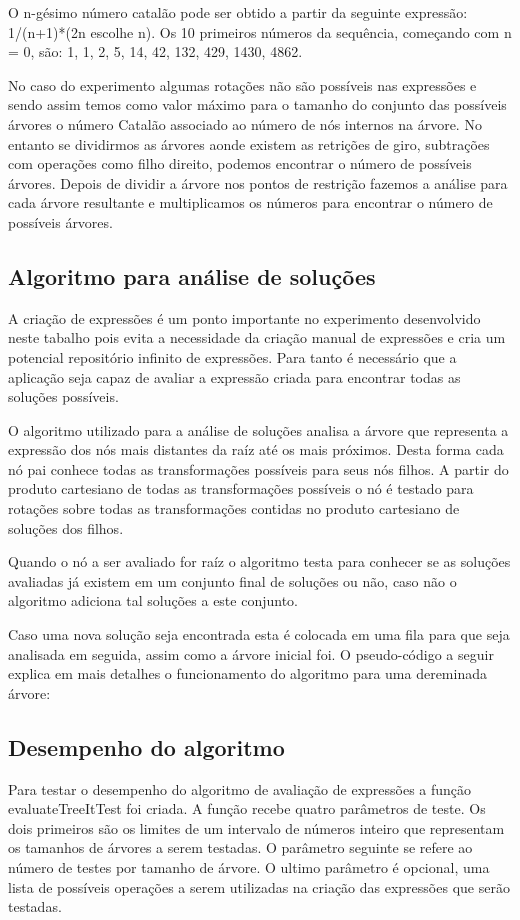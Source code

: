 	O n-gésimo número catalão pode ser obtido a partir da seguinte expressão: 1/(n+1)*(2n escolhe n). Os 10 primeiros números da sequência, começando com n = 0, são: 1, 1, 2, 5, 14, 42, 132, 429, 1430, 4862.

	No caso do experimento algumas rotações não são possíveis nas expressões e sendo assim temos como valor máximo para o tamanho do conjunto das possíveis árvores o número Catalão associado ao número de nós internos na árvore. No entanto se dividirmos as árvores aonde existem as retrições de giro, subtrações com operações como filho direito, podemos encontrar o número de possíveis árvores. Depois de dividir a árvore nos pontos de restrição fazemos a análise para cada árvore resultante e multiplicamos os números para encontrar o número de possíveis árvores.
	
\subsection{Algoritmo para análise de soluções}
A criação de expressões é um ponto importante no experimento desenvolvido neste tabalho pois evita a necessidade da criação manual de expressões e cria um potencial repositório infinito de expressões. Para tanto é necessário que a aplicação seja capaz de avaliar a expressão criada para encontrar todas as soluções possíveis.

	O algoritmo utilizado para a análise de soluções analisa a árvore que representa a expressão dos nós mais distantes da raíz até os mais próximos. Desta forma cada nó pai conhece todas as transformações possíveis para seus nós filhos. A partir do produto cartesiano de todas as transformações possíveis o nó é testado para rotações sobre todas as transformações contidas no produto cartesiano de soluções dos filhos.
	
	Quando o nó a ser avaliado for raíz o algoritmo testa para conhecer se as soluções avaliadas já existem em um conjunto final de soluções ou não, caso não o algoritmo adiciona tal soluções a este conjunto.
	
	Caso uma nova solução seja encontrada esta é colocada em uma fila para que seja analisada em seguida, assim como a árvore inicial foi. O pseudo-código a seguir explica em mais detalhes o funcionamento do algoritmo para uma dereminada árvore:
	
\subsection{Desempenho do algoritmo}
Para testar o desempenho do algoritmo de avaliação de expressões a função evaluateTreeItTest foi criada. A função recebe quatro parâmetros de teste. Os dois primeiros são os limites de um intervalo de números inteiro que representam os tamanhos de árvores a serem testadas. O parâmetro seguinte se refere ao número de testes por tamanho de árvore. O ultimo parâmetro é opcional, uma lista de possíveis operações a serem utilizadas na criação das expressões que serão testadas.

